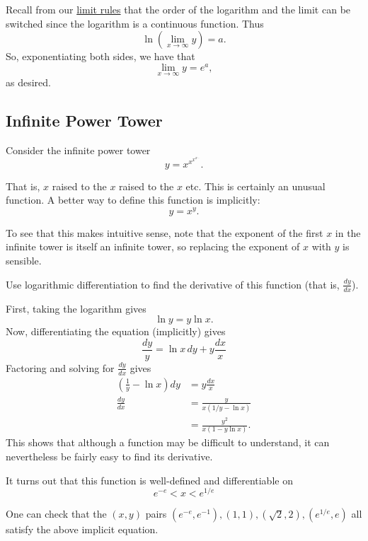\documentclass[twoside,openright,titlepage,a4paper]{book}
\begin{document}
\begin{sloppypar}
\begin{examplebox}
Recall from our \hyperref[ChFunctionsSecLimitsSubsecRulesForLimits]{limit rules} that the order of the logarithm and the limit can be switched since the logarithm is a continuous function. Thus \[ \ln \left(\lim_{x \rightarrow \infty} y \right) = a. \]
So, exponentiating both sides, we have that \[ \lim_{x\rightarrow \infty} y = e^a, \] as desired.	
\end{examplebox}

\subsection{Infinite Power Tower}
Consider the infinite power tower \[ y = x^{x^{x^{x^{\dotsb}}}}. \]

That is, $x$ raised to the $x$ raised to the $x$ etc. This is certainly an unusual function. A better way to define this function is implicitly: \[ y = x^y. \]

To see that this makes intuitive sense, note that the exponent of the first $x$ in the infinite tower is itself an infinite tower, so replacing the exponent of $x$ with $y$ is sensible.

Use logarithmic differentiation to find the derivative of this function (that is, $\frac{dy}{dx}$).
\begin{examplebox}
First, taking the logarithm gives \[ \ln y = y \ln x. \]
Now, differentiating the equation (implicitly) gives \[ \frac{dy}{y} = \ln x \, dy + y \frac{dx}{x} \]
Factoring and solving for $\frac{dy}{dx}$ gives
\begin{align*}
\left(\frac{1}{y} - \ln x\right)dy &= y \frac{dx}{x} \\
\frac{dy}{dx} &= \frac{y}{x \left(1/y-\ln x\right)} \\
&= \frac{y^2}{x (1- y \ln x)}. 
\end{align*}
This shows that although a function may be difficult to understand, it can nevertheless be fairly easy to find its derivative.	
\end{examplebox}

It turns out that this function is well-defined and differentiable on \[ e^{-e} < x < e^{1/e} \]

One can check that the $(x,y)$ pairs $(e^{-e},e^{-1}),(1,1),(\sqrt{2},2),(e^{1/e},e)$ all satisfy the above implicit equation.
	

\end{sloppypar}
\end{document}
